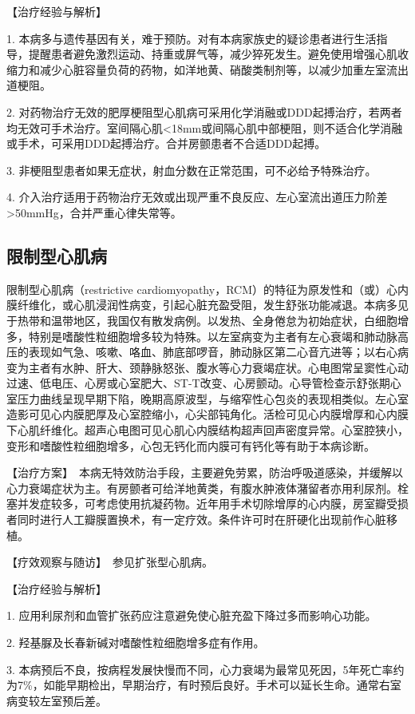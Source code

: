 【治疗经验与解析】

1.
本病多与遗传基因有关，难于预防。对有本病家族史的疑诊患者进行生活指导，提醒患者避免激烈运动、持重或屏气等，减少猝死发生。避免使用增强心肌收缩力和减少心脏容量负荷的药物，如洋地黄、硝酸类制剂等，以减少加重左室流出道梗阻。

2.
对药物治疗无效的肥厚梗阻型心肌病可采用化学消融或DDD起搏治疗，若两者均无效可手术治疗。室间隔心肌\textless{}18mm或间隔心肌中部梗阻，则不适合化学消融或手术，可采用DDD起搏治疗。合并房颤患者不合适DDD起搏。

3. 非梗阻型患者如果无症状，射血分数在正常范围，可不必给予特殊治疗。

4.
介入治疗适用于药物治疗无效或出现严重不良反应、左心室流出道压力阶差\textgreater{}50mmHg，合并严重心律失常等。

\subsection{限制型心肌病}

限制型心肌病（restrictive
cardiomyopathy，RCM）的特征为原发性和（或）心内膜纤维化，或心肌浸润性病变，引起心脏充盈受阻，发生舒张功能减退。本病多见于热带和温带地区，我国仅有散发病例。以发热、全身倦怠为初始症状，白细胞增多，特别是嗜酸性粒细胞增多较为特殊。以左室病变为主者有左心衰竭和肺动脉高压的表现如气急、咳嗽、咯血、肺底部啰音，肺动脉区第二心音亢进等；以右心病变为主者有水肿、肝大、颈静脉怒张、腹水等心力衰竭症状。心电图常呈窦性心动过速、低电压、心房或心室肥大、ST-T改变、心房颤动。心导管检查示舒张期心室压力曲线呈现早期下陷，晚期高原波型，与缩窄性心包炎的表现相类似。左心室造影可见心内膜肥厚及心室腔缩小，心尖部钝角化。活检可见心内膜增厚和心内膜下心肌纤维化。超声心电图可见心肌心内膜结构超声回声密度异常。心室腔狭小，变形和嗜酸性粒细胞增多，心包无钙化而内膜可有钙化等有助于本病诊断。

【治疗方案】　本病无特效防治手段，主要避免劳累，防治呼吸道感染，并缓解以心力衰竭症状为主。有房颤者可给洋地黄类，有腹水肿液体潴留者亦用利尿剂。栓塞并发症较多，可考虑使用抗凝药物。近年用手术切除增厚的心内膜，房室瓣受损者同时进行人工瓣膜置换术，有一定疗效。条件许可时在肝硬化出现前作心脏移植。

【疗效观察与随访】　参见扩张型心肌病。

【治疗经验与解析】

1. 应用利尿剂和血管扩张药应注意避免使心脏充盈下降过多而影响心功能。

2. 羟基脲及长春新碱对嗜酸性粒细胞增多症有作用。

3.
本病预后不良，按病程发展快慢而不同，心力衰竭为最常见死因，5年死亡率约为7\%，如能早期检出，早期治疗，有时预后良好。手术可以延长生命。通常右室病变较左室预后差。

